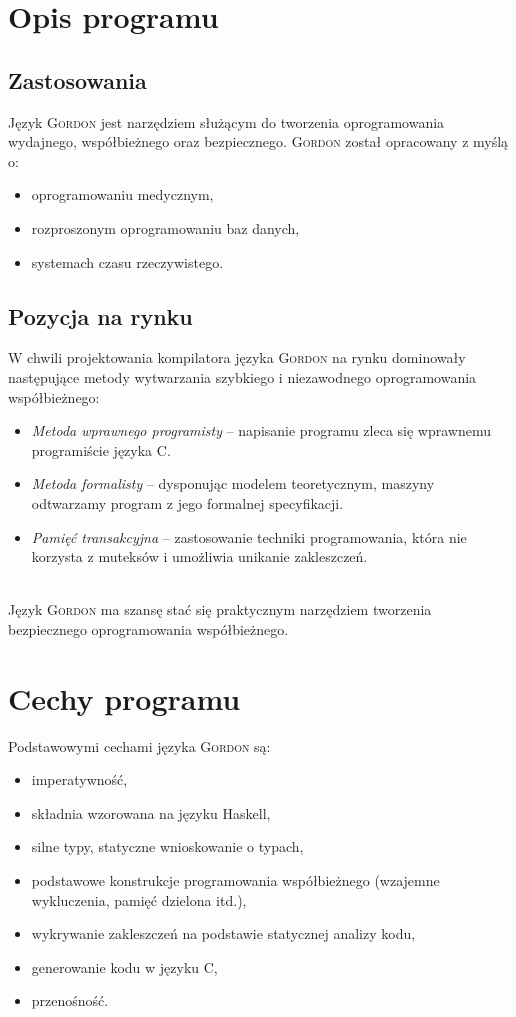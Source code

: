 \documentclass{documentation}
\begin{document}
\section{Opis programu}
\subsection{Zastosowania}
\noindent Język \textsc{Gordon} jest narzędziem służącym do tworzenia oprogramowania wydajnego, współbieżnego oraz bezpiecznego. 
\textsc{Gordon} został opracowany z myślą o:
\begin{itemize}
    \item oprogramowaniu medycznym,
    \item rozproszonym oprogramowaniu baz danych,
    \item systemach czasu rzeczywistego.
\end{itemize}

\subsection{Pozycja na rynku}
\noindent W chwili projektowania kompilatora języka \textsc{Gordon} na rynku dominowały następujące metody wytwarzania szybkiego i niezawodnego oprogramowania współbieżnego:
\begin{itemize}
    \item \emph{Metoda wprawnego programisty} -- napisanie programu zleca się wprawnemu programiście języka \textsc{C}.
    \item \emph{Metoda formalisty} -- dysponując modelem teoretycznym, maszyny odtwarzamy program z jego formalnej specyfikacji.
    \item \emph{Pamięć transakcyjna} -- zastosowanie techniki programowania, która nie korzysta z muteksów i umożliwia unikanie zakleszczeń.
\end{itemize}
~\\
Język \textsc{Gordon} ma szansę stać się praktycznym narzędziem tworzenia bezpiecznego oprogramowania współbieżnego.

\section{Cechy programu}
\noindent Podstawowymi cechami języka \textsc{Gordon} są:
\begin{itemize}
\item imperatywność,
\item składnia wzorowana na języku Haskell,
\item silne typy, statyczne wnioskowanie o typach,
\item podstawowe konstrukcje programowania współbieżnego (wzajemne wykluczenia, pamięć dzielona itd.),
\item wykrywanie zakleszczeń na podstawie statycznej analizy kodu,
\item generowanie kodu w języku C,
\item przenośność.
\end{itemize}
\end{document}

